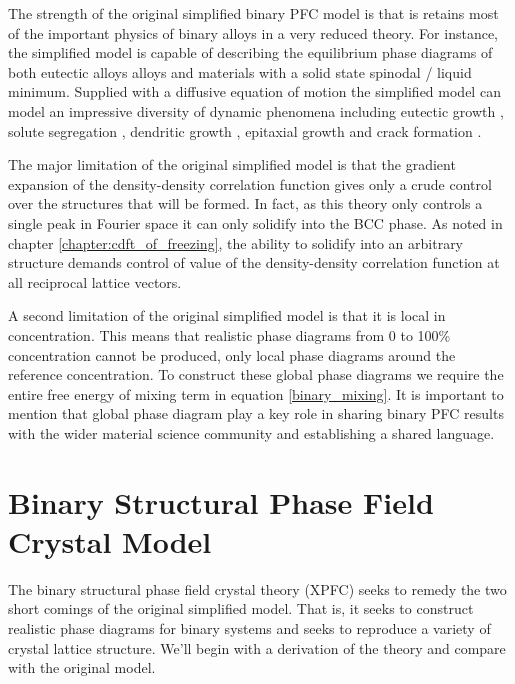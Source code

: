 The strength of the original simplified binary PFC model is that is retains
most of the important physics of binary alloys in a very reduced theory. For
instance, the simplified model is capable of describing the equilibrium phase
diagrams of both eutectic alloys alloys and materials with a solid state
spinodal / liquid minimum.  Supplied with a diffusive equation of motion the
simplified model can model an impressive diversity of dynamic phenomena
including eutectic growth \cite{ELDER07}, solute segregation \cite{STOLLE14},
dendritic growth \cite{ELDER07}, epitaxial growth \cite{ELDER10_NANOISLAND,
LU16} and crack formation \cite{HU17}.

The major limitation of the original simplified model is that the gradient
expansion of the density-density correlation function gives only a crude
control over the structures that will be formed. In fact, as this theory only
controls a single peak in Fourier space it can only solidify into the BCC
phase. As noted in chapter \ref{chapter:cdft_of_freezing}, the ability to
solidify into an arbitrary structure demands control of value of the
density-density correlation function at all reciprocal lattice vectors.

A second limitation of the original simplified model is that it is local in
concentration. This means that realistic phase diagrams from 0 to 100\%
concentration cannot be produced, only local phase diagrams around the
reference concentration. To construct these global phase diagrams we require
the entire free energy of mixing term in equation \ref{binary_mixing}. It 
is important to mention that global phase diagram play a key role in 
sharing binary PFC results with the wider material science community and
establishing a shared language. 

\section{Binary Structural Phase Field Crystal Model} %

The binary structural phase field crystal theory (XPFC) seeks to remedy the two
short comings of the original simplified model. That is, it seeks to construct
realistic phase diagrams for binary systems and seeks to reproduce a variety 
of crystal lattice structure. We'll begin with a derivation of the theory and
compare with the original model.

